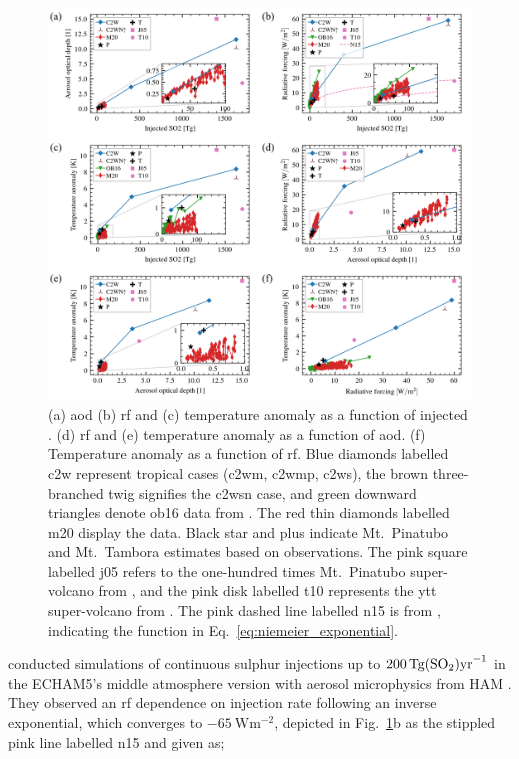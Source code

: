 \documentclass{ametsocV6.1}
\newcommand{\iso}[1][i]{{#1}njected \ce{SO2}}
\begin{document}
\begin{figure}
  \centering
  \includegraphics{figures/figure4.png}

  \caption{(a) \gls{aod} (b) \gls{rf} and (c) temperature anomaly as a function of
    \iso{}\@. (d) \gls{rf} and (e) temperature anomaly as a function of \gls{aod}. (f)
    Temperature anomaly as a function of \gls{rf}. Blue diamonds labelled \gls{c2w}
    represent tropical cases (\gls{c2wm}, \gls{c2wmp}, \gls{c2ws}), the brown three-branched
    twig signifies the \gls{c2wsn} case, and green downward triangles denote \gls{ob16} data
    from \citet{ottobliesner2016}. The red thin diamonds labelled \gls{m20} display the
    \citet{marshall2020dataset} data. Black star and plus indicate Mt.\ Pinatubo and Mt.\
    Tambora estimates based on observations. The pink square labelled \gls{j05} refers to
    the one-hundred times Mt.\ Pinatubo super-volcano from \citet{jones2005}, and the pink
    disk labelled \gls{t10} represents the \gls{ytt} super-volcano from
    \citet{timmreck2010}. The pink dashed line labelled \gls{n15} is from
    \citet{niemeier2015}, indicating the function in
    Eq.~\ref{eq:niemeier_exponential}.}\label{fig:parameter_scan}%
\end{figure}

\citet{niemeier2015} conducted simulations of continuous sulphur injections up to
\(\SI{200}{\tera\gram(\ce{SO2})\mathrm{yr}^{-1}}\) in the ECHAM5's middle atmosphere
version \citep{giorgetta2006} with aerosol microphysics from HAM \citep{stier2005}. They
observed an \gls{rf} dependence on \ce{SO2} injection rate following an inverse
exponential, which converges to \(\SI{-65}{\watt\meter^{-2}}\), depicted in
Fig.~\ref{fig:parameter_scan}b as the stippled pink line labelled \gls{n15} and given
as;
\end{document}
